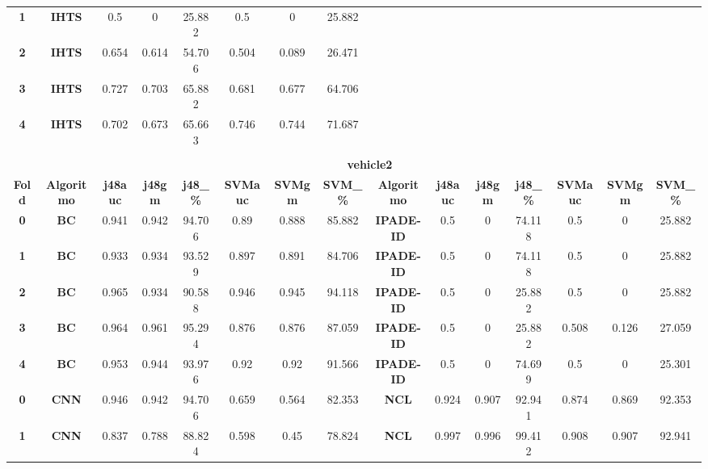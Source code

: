 {{\begin{tabular}{c|c|cccccc|ccccccc}
\textbf{1} & \textbf{IHTS} & 0.5   & 0     & 25.882 & 0.5   & 0     & 25.882 &       &       &       &       &       &       &  \\
\textbf{2} & \textbf{IHTS} & 0.654 & 0.614 & 54.706 & 0.504 & 0.089 & 26.471 &       &       &       &       &       &       &  \\
\textbf{3} & \textbf{IHTS} & 0.727 & 0.703 & 65.882 & 0.681 & 0.677 & 64.706 &       &       &       &       &       &       &  \\
\textbf{4} & \textbf{IHTS} & 0.702 & 0.673 & 65.663 & 0.746 & 0.744 & 71.687 &       &       &       &       &       &       &  \\
\multicolumn{1}{c}{} & \multicolumn{1}{c}{} &       &       &       &       &       & \multicolumn{1}{c}{} &       &       &       &       &       &       &  \\
\multicolumn{1}{c}{} & \multicolumn{14}{c}{\textbf{vehicle2}} \\
\midrule
\textbf{Fold} & \textbf{Algoritmo} & \textbf{j48auc} & \textbf{j48gm} & \textbf{j48\_\%} & \textbf{SVMauc} & \textbf{SVMgm} & \textbf{SVM\_\%} & \multicolumn{1}{c|}{\textbf{Algoritmo}} & \textbf{j48auc} & \textbf{j48gm} & \textbf{j48\_\%} & \textbf{SVMauc} & \textbf{SVMgm} & \textbf{SVM\_\%} \\
\midrule
\textbf{0} & \textbf{BC} & 0.941 & 0.942 & 94.706 & 0.89  & 0.888 & 85.882 & \multicolumn{1}{c|}{\textbf{IPADE-ID}} & 0.5   & 0     & 74.118 & 0.5   & 0     & 25.882 \\
\textbf{1} & \textbf{BC} & 0.933 & 0.934 & 93.529 & 0.897 & 0.891 & 84.706 & \multicolumn{1}{c|}{\textbf{IPADE-ID}} & 0.5   & 0     & 74.118 & 0.5   & 0     & 25.882 \\
\textbf{2} & \textbf{BC} & 0.965 & 0.934 & 90.588 & 0.946 & 0.945 & 94.118 & \multicolumn{1}{c|}{\textbf{IPADE-ID}} & 0.5   & 0     & 25.882 & 0.5   & 0     & 25.882 \\
\textbf{3} & \textbf{BC} & 0.964 & 0.961 & 95.294 & 0.876 & 0.876 & 87.059 & \multicolumn{1}{c|}{\textbf{IPADE-ID}} & 0.5   & 0     & 25.882 & 0.508 & 0.126 & 27.059 \\
\textbf{4} & \textbf{BC} & 0.953 & 0.944 & 93.976 & 0.92  & 0.92  & 91.566 & \multicolumn{1}{c|}{\textbf{IPADE-ID}} & 0.5   & 0     & 74.699 & 0.5   & 0     & 25.301 \\
\textbf{0} & \textbf{CNN} & 0.946 & 0.942 & 94.706 & 0.659 & 0.564 & 82.353 & \multicolumn{1}{c|}{\textbf{NCL}} & 0.924 & 0.907 & 92.941 & 0.874 & 0.869 & 92.353 \\
\textbf{1} & \textbf{CNN} & 0.837 & 0.788 & 88.824 & 0.598 & 0.45  & 78.824 & \multicolumn{1}{c|}{\textbf{NCL}} & 0.997 & 0.996 & 99.412 & 0.908 & 0.907 & 92.941 \\

\end{tabular}}}
